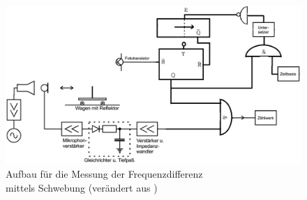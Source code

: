 \begin{figure}[!h]
  \centering
  \includegraphics[scale=0.5]{Grafiken/V104_Abb4.jpg}
  \caption{Aufbau für die Messung der Frequenzdifferenz\\\hspace*{2.6cm} mittels Schwebung (verändert aus \cite{V104})}
  \label{fig:V104_Abb4}
\end{figure}

